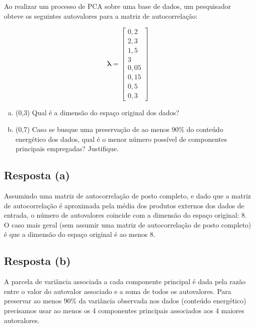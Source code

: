 \documentclass[final,3p]{elsarticle}
\numberwithin{equation}{section}
\begin{document}
    Ao realizar um processo de PCA sobre uma base de dados, um pesquisador obteve os seguintes autovalores para a matriz de autocorrelação:

    \begin{equation}
        \mathbf{\lambda{}} =
        \begin{bmatrix}
            0,2 \\
            2,3 \\
            1,5 \\
            3 \\
            0,05 \\
            0,15 \\
            0,5 \\
            0,3
        \end{bmatrix}
    \end{equation}

    \begin{enumerate}[(a)]
        \item (0,3) Qual é a dimensão do espaço original dos dados?
        \item (0,7) Caso se busque uma preservação de ao menos 90\% do conteúdo energético dos dados, qual é o menor número possível de componentes principais empregadas? Justifique.
    \end{enumerate}

    \subsection{Resposta \textbf{(a)}}

        Assumindo uma matriz de autocorrelação de posto completo, e dado que a matriz de autocorrelação é aproximada pela média dos produtos externos dos dados de entrada, o número de autovalores coincide com a dimensão do espaço original: 8. O caso mais geral (sem assumir uma matriz de autocorrelação de posto completo) é que a dimensão do espaço original é ao menos 8.

    \subsection{Resposta \textbf{(b)}}

        A parcela de variância associada a cada componente principal é dada pela razão entre o valor do autovalor associado e a soma de todos os autovalores. Para preservar ao menos 90\% da variância observada nos dados (conteúdo energético) precisamos usar ao menos os 4 componentes principais associados aos 4 maiores autovalores.
\end{document}
